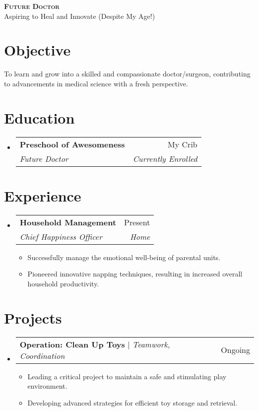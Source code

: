 \documentclass[letterpaper,11pt]{article}
\makeatletter
\newcommand{\resumeItem}[1]{
\item\small{
{#1 \vspace{-2pt}}
}
}
\newcommand{\resumeSubheading}[4]{
\vspace{-2pt}\item
\begin{tabular*}{0.97\textwidth}[t]{l@{\extracolsep{\fill}}r}
\textbf{#1} & #2 \\
\textit{\small#3} & \textit{\small #4} \\
\end{tabular*}\vspace{-7pt}
}
\newcommand{\resumeProjectHeading}[2]{
\item
\begin{tabular*}{0.97\textwidth}{l@{\extracolsep{\fill}}r}
\small#1 & #2 \\
\end{tabular*}\vspace{-7pt}
}
\newcommand{\resumeSubHeadingListStart}{\begin{itemize}[leftmargin=0.15in, label={}]}
\newcommand{\resumeSubHeadingListEnd}{\end{itemize}}
\newcommand{\resumeItemListStart}{\begin{itemize}}
\newcommand{\resumeItemListEnd}{\end{itemize}\vspace{-5pt}}
\makeatother
\begin{document}
\begin{center}
\textbf{\Huge \scshape Future Doctor} \\ \vspace{1pt}
\small Aspiring to Heal and Innovate (Despite My Age!)
\end{center}


\section{Objective} %
To learn and grow into a skilled and compassionate doctor/surgeon, contributing to advancements in medical science with a fresh perspective.

\section{Education}
\resumeSubHeadingListStart
\resumeSubheading{Preschool of Awesomeness}{My Crib}{Future Doctor}{Currently Enrolled}
\resumeSubHeadingListEnd

\section{Experience}
\resumeSubHeadingListStart
\resumeSubheading{Household Management}{Present}{Chief Happiness Officer}{Home}
\resumeItemListStart
\resumeItem{Successfully manage the emotional well-being of parental units.}
\resumeItem{Pioneered innovative napping techniques, resulting in increased overall household productivity.}
\resumeItemListEnd
\resumeSubHeadingListEnd

\section{Projects}
\resumeSubHeadingListStart
\resumeProjectHeading{\textbf{Operation: Clean Up Toys} $|$ \emph{Teamwork, Coordination}}{Ongoing}
\resumeItemListStart
\resumeItem{Leading a critical project to maintain a safe and stimulating play environment.}
\resumeItem{Developing advanced strategies for efficient toy storage and retrieval.}
\resumeItemListEnd
\resumeSubHeadingListEnd
\end{document}
